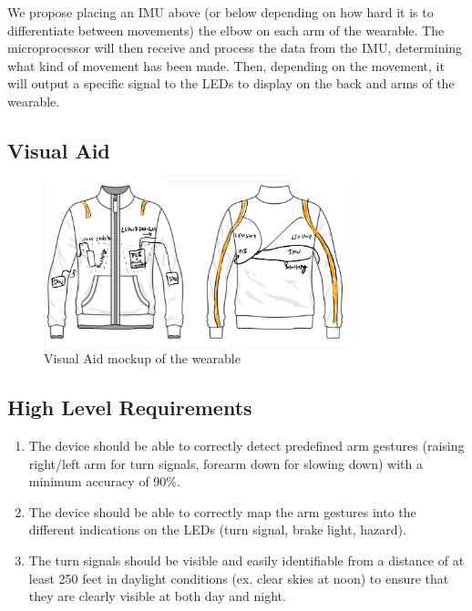 \documentclass[12pt]{article}
\begin{document}
We propose placing an IMU above (or below depending on how hard 
it is to differentiate between movements) the elbow on each arm 
of the wearable. The microprocessor will then receive and process 
the data from the IMU, determining what kind of movement has been 
made. Then, depending on the movement, it will output a specific 
signal to the LEDs to display on the back and arms of the wearable. 

\newpage
\subsection{Visual Aid}
\begin{figure}[ht]
    \centering
    \includegraphics[width=0.8\textwidth]{visual_aid.jpg}
    \caption{Visual Aid mockup of the wearable \cite{VectorStock2024}}
    \label{fig:my_label}
\end{figure}
\subsection{High Level Requirements}
\begin{enumerate}
    \item The device should be able to correctly detect 
    predefined arm gestures (raising right/left arm for 
    turn signals, forearm down for slowing down) with a 
    minimum accuracy of 90\%. 

    \item The device should be able to correctly map the arm 
    gestures into the different indications on the LEDs 
    (turn signal, brake light, hazard).

    \item The turn signals should be visible and easily 
    identifiable from a distance of at least 250 feet in 
    daylight conditions (ex. clear skies at noon) to ensure 
    that they are clearly visible at both day and night. 
\end{enumerate}
\end{document}
